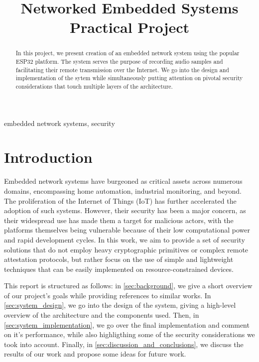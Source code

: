 \documentclass[conference]{IEEEtran}
\begin{document}
\title{Networked Embedded Systems Practical Project}

\author{
\and
{}
}

\maketitle

\begin{abstract}
    In this project, we present creation of an
    embedded network system using the popular ESP32 platform. The system serves
    the purpose of recording audio samples and facilitating their remote
    transmission over the Internet. We go into the design and implementation
    of the sytem while simultaneously putting attention
    on pivotal security considerations that touch multiple
    layers of the architecture. 
\end{abstract}

\begin{IEEEkeywords}
embedded network systems, security
\end{IEEEkeywords}

\section{Introduction}

Embedded network systems have burgeoned as critical assets across numerous
domains, encompassing home automation, industrial monitoring, and beyond. 
The proliferation of the Internet of Things (IoT) has further accelerated the
adoption of such systems\cite{IotTechEmbedded}.
However, their security has been a major concern,\cite{EmbeddedSecSurveyEU}
as their widespread use has made them a target for malicious actors, 
with the platforms themselves being vulnerable because of their low computational power and
rapid development cycles\cite{EmbeddedSecChallenges}.
In this work, we aim to provide a set of security solutions that do not employ 
heavy cryptographic primitives or complex remote attestation protocols, but rather
focus on the use of simple and lightweight techniques that can be easily implemented
on resource-constrained devices.

This report is structured as follows: in \cref{sec:background}, 
we give a short overview of our project's goals while providing references to similar works. 
In \cref{sec:system_design}, we go into the design of the system, giving a high-level overview of the architecture and 
the components used. Then, in \cref{sec:system_implementation}, we go over the final implementation and comment on it's performance, 
while also highligthing some of the security considerations we took into account. Finally, in \cref{sec:discussion_and_conclusions},
we discuss the results of our work and propose some ideas for future work.
\end{document}
